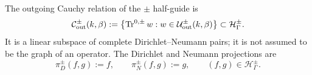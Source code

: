 \begin{definition}
\label{def:outgoing-relations}
The outgoing Cauchy relation of the $\pm$ half-guide is
\begin{equation}
  \mathcal C^\pm_{\mathrm{out}}(k,\beta)
  :=\left\{\operatorname{Tr}^{0,\pm} w:w\in
  \mathcal U^\pm_{\mathrm{out}}(k,\beta)\right\}
  \subset\mathcal H_\Gamma^\pm.
  \label{eq:outgoing-relation}
\end{equation}
It is a linear subspace of complete Dirichlet--Neumann pairs; it is not assumed
to be the graph of an operator.  The Dirichlet and Neumann projections are
\begin{equation}
  \pi_D^\pm(f,g):=f,\qquad \pi_N^\pm(f,g):=g,
  \qquad (f,g)\in\mathcal H_\Gamma^\pm.
  \label{eq:trace-projections}
\end{equation}
\end{definition}

